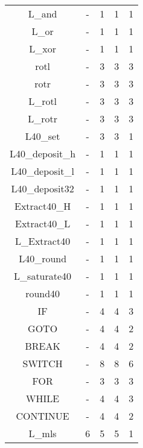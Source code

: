 \begin{longtable}{|c|c|c|c|c|}
L\_and                  & -       & 1       & 1       & 1        \\
L\_or                   & -       & 1       & 1       & 1        \\
L\_xor                  & -       & 1       & 1       & 1        \\
rotl                    & -       & 3       & 3       & 3        \\
rotr                    & -       & 3       & 3       & 3        \\
L\_rotl                 & -       & 3       & 3       & 3        \\
L\_rotr                 & -       & 3       & 3       & 3        \\
L40\_set                & -       & 3       & 3       & 1        \\
L40\_deposit\_h         & -       & 1       & 1       & 1        \\
L40\_deposit\_l         & -       & 1       & 1       & 1        \\
L40\_deposit32          & -       & 1       & 1       & 1        \\
Extract40\_H            & -       & 1       & 1       & 1        \\
Extract40\_L            & -       & 1       & 1       & 1        \\
L\_Extract40            & -       & 1       & 1       & 1        \\
L40\_round              & -       & 1       & 1       & 1        \\
L\_saturate40           & -       & 1       & 1       & 1        \\
round40                 & -       & 1       & 1       & 1        \\
IF                      & -       & 4       & 4       & 3        \\
GOTO                    & -       & 4       & 4       & 2        \\
BREAK                   & -       & 4       & 4       & 2        \\
SWITCH                  & -       & 8       & 8       & 6        \\
FOR                     & -       & 3       & 3       & 3        \\
WHILE                   & -       & 4       & 4       & 3        \\
CONTINUE                & -       & 4       & 4       & 2        \\
L\_mls                  & 6       & 5       & 5       & 1        \\

\end{longtable}
